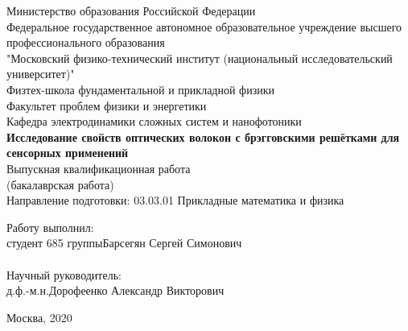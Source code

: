 \begin{center}
	
	
	\large
    Министерство образования Российской Федерации\\
    \vspace{1cm}
	Федеральное государственное автономное образовательное учреждение
		высшего профессионального образования\\
		"Московский физико-технический институт (национальный исследовательский университет)"\\
	\vspace{0.5cm}
    Физтех-школа фундаментальной и прикладной физики\\
    \vspace{0.5cm}
	Факультет проблем физики и энергетики\\
	\vspace{0.5cm}
	Кафедра электродинамики сложных систем и нанофотоники\\
	\vspace{2cm}
	\textbf{Исследование свойств оптических волокон с брэгговскими решётками для сенсорных применений} \\
	Выпускная квалификационная работа\\
	(бакалаврская работа)\\
	\vspace{1cm}
	Направление подготовки: 03.03.01 Прикладные математика и физика
	
\end{center}
\vspace{1.0cm}
Работу выполнил:\\ 
студент 685 группы\hspace{1.7cm}\underline{\hspace{2.8cm}}\hspace{0.5cm}Барсегян Сергей Симонович\\
\vspace{1.0cm}\\
Научный руководитель:\\
д.ф.-м.н.\hspace{2.7cm}\underline{\hspace{2.8cm}}\hspace{0.5cm}Дорофеенко Александр Викторович\\

\begin{center}
	\vspace{5cm}
	{Москва, 2020}
\end{center}

\thispagestyle{empty}

\pagebreak[4]
\setcounter{page}{1} 

